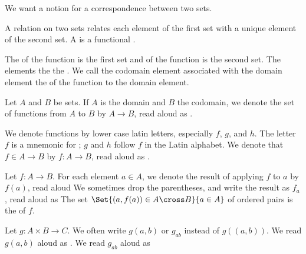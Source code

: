 

We want a notion for a correspondence
between two sets.


A  relation
on two sets relates each element of the
first set with a unique element of the
second set.
A  is a
functional .

The  of the function is
the first set and 
of the function is the second set.
The 
 elements
 the
 
the .
We call the codomain element associated
with the domain element the
 of
the function to the domain element.


Let $A$ and $B$ be sets.
If $A$ is the domain and $B$ the codomain,
we denote the set of functions from $A$ to
$B$ by $A \to B$, read aloud as .

We denote functions by lower case latin letters,
especially $f$, $g$, and $h$.
The letter $f$ is a mnemonic for
;
$g$ and $h$ follow $f$ in the Latin alphabet.
We denote that $f \in A \to B$ by
$f: A \to B$, read aloud as
.

Let $f: A \to B$.
For each element $a \in A$, we denote the
result of applying
$f$ to $a$ by $f(a)$, read aloud
We sometimes drop the parentheses, and write
the result as $f_a$, read aloud as
The set $\Set{(a, f(a)) \in A \cross B}{a \in A}$ of ordered pairs is the  of $f$.

Let $g: A \times B \to C$.
We often write $g(a,b)$ or $g_{ab}$
instead of $g((a,b))$.
We read $g(a, b)$ aloud as
.
We read $g_{ab}$ aloud as

